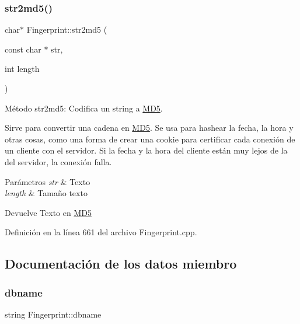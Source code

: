 \hypertarget{classFingerprint_aefb69bba57960202c3763d61416be5d7}{}\label{classFingerprint_aefb69bba57960202c3763d61416be5d7} 
\subsubsection{\texorpdfstring{str2md5()}{str2md5()}}
{\footnotesize\ttfamily char$\ast$ Fingerprint\+::str2md5 (\begin{DoxyParamCaption}\item[{const char $\ast$}]{str,  }\item[{int}]{length }\end{DoxyParamCaption})\hspace{0.3cm}{\ttfamily [inline]}}



Método str2md5\+: Codifica un string a \hyperlink{classMD5}{M\+D5}. 

Sirve para convertir una cadena en \hyperlink{classMD5}{M\+D5}. Se usa para hashear la fecha, la hora y otras cosas, como una forma de crear una cookie para certificar cada conexión de un cliente con el servidor. Si la fecha y la hora del cliente están muy lejos de la del servidor, la conexión falla.


\begin{DoxyParams}{Parámetros}
{\em str} & Texto \\
\hline
{\em length} & Tamaño texto \\
\hline
\end{DoxyParams}
\begin{DoxyReturn}{Devuelve}
Texto en \hyperlink{classMD5}{M\+D5} 
\end{DoxyReturn}


Definición en la línea 661 del archivo Fingerprint.\+cpp.



\subsection{Documentación de los datos miembro}
\hypertarget{classFingerprint_a673ea9e701f981e8d47873da6c018959}{}\label{classFingerprint_a673ea9e701f981e8d47873da6c018959} 
\subsubsection{\texorpdfstring{dbname}{dbname}}
{\footnotesize\ttfamily string Fingerprint\+::dbname}



